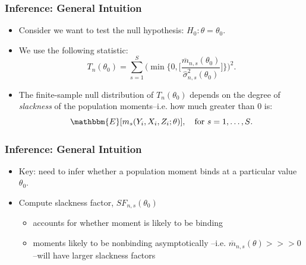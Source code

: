 \documentclass[10pt,letterpaper]{beamer}
\begin{document}

\begin{frame}
\frametitle{Inference: General Intuition}

\begin{itemize}
\item Consider we want to test the null hypothesis: $H_{0}: \theta=\theta_{0}
$. 

\item We use the following statistic:  
\begin{equation*}
T_{n}(\theta_{0})=\sum_{s=1}^{S}\Big(\min\{0,\Big[\frac{\overline{m}%
_{n,s}(\theta_{0})}{\hat{\sigma}^{2}_{n,s}(\theta_{0})}\Big]\}\Big)^{2}.
\end{equation*}

\item The finite-sample null distribution of $T_{n}(\theta_{0})$ depends on
the degree of \textit{slackness} of the population moments--i.e. how much
greater than 0 is:  
\begin{equation*}
\mathbbm{E}[m_{s}(Y_{i},X_{i},Z_{i};\theta)],\quad\text{for $s=1,\dots,S$}.
\end{equation*}

\end{itemize}
\end{frame}


\begin{frame}
\frametitle{Inference: General Intuition}

\begin{itemize}
\item Key: need to infer whether a population moment binds at a particular
value $\theta_{0}$. 

\item Compute slackness factor, $SF_{n,s}(\theta_{0})$ 

\begin{itemize}
\item accounts for whether moment is likely to be binding 

\item moments likely to be nonbinding asymptotically --i.e. $\overline{m}%
_{n,s}(\theta)>>>0$--will have larger slackness factors 
\end{itemize}
\end{itemize}
\end{frame}

\end{document}
